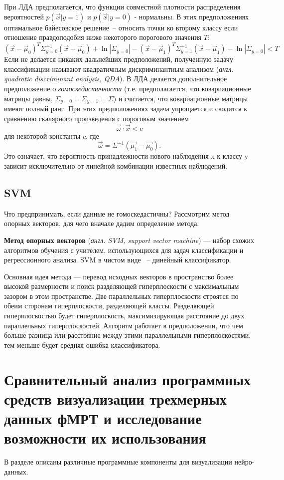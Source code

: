 При ЛДА предполагается, что функции совместной плотности распределения вероятностей $p(\vec{x}|y=1)$ и $p(\vec{x}|y=0)$ - нормальны. В этих предположениях оптимальное байесовское решение~-- относить точки ко второму классу если отношение правдоподобия ниже некоторого порогового значения $T$: 
$$(\vec{x}-\vec{\mu}_0)^T\Sigma_{y=0}^{-1}(\vec{x}-\vec{\mu}_0)+\ln{|\Sigma _{y=0}|}-(\vec{x}-\vec{\mu}_1)^T\Sigma _{y=1}^{-1}(\vec{x}-\vec{\mu}_1)-\ln{|\Sigma_{y=0}|}<T$$
Если не делается никаких дальнейших предположений, полученную задачу классификации называют квадратичным дискриминантным анализом (\textit{англ. quadratic discriminant analysis, QDA}). В ЛДА делается дополнительное предположение о \textit{гомоскедастичности} (т.е. предполагается, что ковариационные матрицы равны, $\Sigma_{y=0}=\Sigma_{y=1}=\Sigma$) и считается, что ковариационные матрицы имеют полный ранг. При этих предположениях задача упрощается и сводится к сравнению скалярного произведения с пороговым значением 
$$\vec{\omega}\cdot\vec{x}<c $$
\noindent
для некоторой константы $c$, где 
$$\vec{\omega}=\Sigma^{-1}(\vec{\mu_1}-\vec{\mu_0}). $$
\noindent
Это означает, что вероятность принадлежности нового наблюдения x к классу y зависит исключительно от линейной комбинации известных наблюдений.


\subsection{SVM}
Что предпринимать, если данные не гомоскедастичны?
Рассмотрим метод опорных векторов, для чего вначале дадим определение метода.

\textbf{Метод опорных векторов} (\emph {англ. SVM, support vector machine}) — набор схожих алгоритмов обучения с учителем, использующихся для задач классификации и регрессионного анализа. SVM в чистом виде ~-- динейный классификатор.

Основная идея метода — перевод исходных векторов в пространство более высокой размерности и поиск разделяющей гиперплоскости с максимальным зазором в этом пространстве. Две параллельных гиперплоскости строятся по обеим сторонам гиперплоскости, разделяющей классы. Разделяющей гиперплоскостью будет гиперплоскость, максимизирующая расстояние до двух параллельных гиперплоскостей. Алгоритм работает в предположении, что чем больше разница или расстояние между этими параллельными гиперплоскостями, тем меньше будет средняя ошибка классификатора.



\section{Сравнительный анализ программных средств визуализации трехмерных данных фМРТ и исследование возможности их использования}
\begin{annotation}
	В разделе описаны  различные программные компоненты для визуализации нейро-данных.
\end{annotation}


